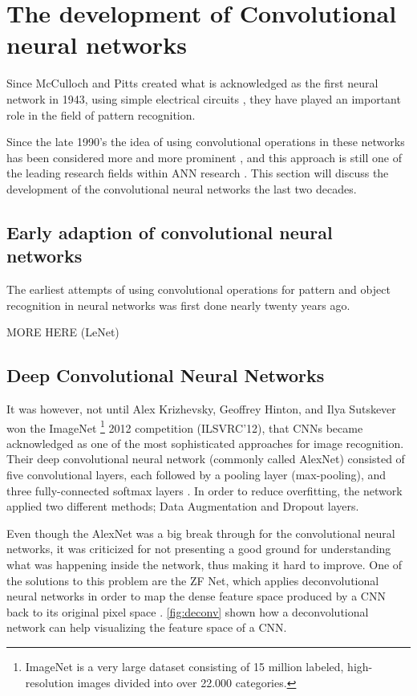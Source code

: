 \section{The development of Convolutional neural networks}
Since McCulloch and Pitts created what is acknowledged as the first neural network in 1943, using simple electrical circuits \citep{Mcculloch1990}, they have played an important role in the field of pattern recognition. 

Since the late 1990's the idea of using convolutional operations in these networks has been considered more and more prominent \citep{LeC}, and this approach is still one of the leading research fields within ANN research \citep{Wu2017}. This section will discuss the development of the convolutional neural networks the last two decades.

\subsection{Early adaption of convolutional neural networks}
The earliest attempts of using convolutional operations for pattern and object recognition in neural networks was first done nearly twenty years ago. 

MORE HERE (LeNet)

\subsection{Deep Convolutional Neural Networks}
It was however, not until Alex Krizhevsky, Geoffrey Hinton, and Ilya Sutskever won the ImageNet \footnote{ImageNet is a very large dataset consisting of 15 million labeled, high-resolution images divided into over 22.000 categories.} 2012 competition (ILSVRC'12), that CNNs became acknowledged as one of the most sophisticated approaches for image recognition. Their deep convolutional neural network (commonly called AlexNet) consisted of five convolutional layers, each followed by a pooling layer (max-pooling), and three fully-connected softmax layers \citep{Krizhevsky2012}.  In order to reduce overfitting, the network applied two different methods; Data Augmentation and Dropout layers.

Even though the AlexNet was a big break through for the convolutional neural networks, it was criticized for not presenting a good ground for understanding what was happening inside the network, thus making it hard to improve. One of the solutions to this problem are the ZF Net, which applies deconvolutional neural networks \citep{Zeiler2011} in order to map the dense feature space produced by a CNN back to its original pixel space \citep{Zeiler2014}. \autoref{fig:deconv} shown how a deconvolutional network can help visualizing the feature space of a CNN.

